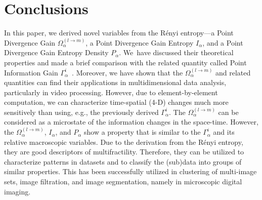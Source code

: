 \documentclass[entropy,article,accept,moreauthors,pdftex,10pt,a4paper]{mdpi}
\begin{document}
\section{Conclusions}\label{sec.5}


In this paper, we derived novel variables from the R\'{e}nyi entropy---a Point Divergence Gain $\Omega_\alpha^{(l \rightarrow m)}$, a Point Divergence Gain Entropy $I_\alpha$, and a Point Divergence Gain Entropy Density $P_\alpha$. We~have discussed their theoretical properties and made a brief comparison with the related quantity called Point Information Gain $\Gamma_\alpha^{i}$~\cite{Ryc16a}. Moreover, we have shown that the $\Omega_\alpha^{(l \rightarrow m)}$ and related quantities can find their applications in multidimensional data analysis, particularly in video processing. However, due to element-by-element computation, we can characterize time-spatial (4-D) changes much more sensitively than using, e.g., the previously derived $\Gamma_\alpha^{i}$. The $\Omega_\alpha^{(l \rightarrow m)}$ can be considered as a microstate of the information changes in the space-time. However, the $\Omega_\alpha^{(l \rightarrow m)}$, $I_\alpha$, and $P_\alpha$ show a property that is similar to the $\Gamma_\alpha^{i}$ and its relative macroscopic variables. Due to the derivation from the R\'{e}nyi entropy, they are good descriptors of multifractility. Therefore, they can be utilized to characterize patterns in datasets and to classify the (sub)data into groups of similar properties. This has been successfully utilized in clustering of multi-image sets, image filtration, and image segmentation, namely in microscopic digital imaging.

\vspace{6pt}
\end{document}
